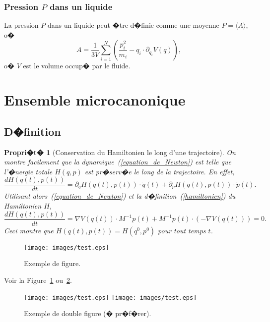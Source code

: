 \documentclass[a4paper,10pt,twoside]{report}
\newtheorem{prop}{Propri�t�}
\begin{document}
\subsubsection{Pression $P$ dans un liquide}

La pression $P$ dans un liquide peut �tre d�finie comme une moyenne $P = \langle A \rangle$, o� 
\[
A = \frac{1}{3V} \sum_{i=1}^{N} \left(\frac{p_{i}^2}{m_{i}} - q_{i} \cdot \partial_{q_{i}} V (q) \right),
\]
o� $V$ est le volume occup� par le fluide.

\section{Ensemble microcanonique}

\subsection{D�finition}

\begin{prop}[Conservation du Hamiltonien le long d'une trajectoire]
On montre facilement que la dynamique~(\ref{equation_de_Newton}) est
telle que l'�nergie totale $H(q,p)$ est pr�serv�e le long de la
trajectoire. En effet,
\[
\frac{dH(q(t),p(t))}{dt} = \partial_q H(q(t),p(t)) \cdot \dot{q}(t) + \partial_p H(q(t),p(t)) \cdot \dot{p}(t).
\]
Utilisant alors~(\ref{equation_de_Newton}) et la d�finition~(\ref{hamiltonien}) du Hamiltonien $H$,
\[
\frac{dH(q(t),p(t))}{dt} = \nabla V(q(t)) \cdot M^{-1} p(t) + M^{-1} p(t) \cdot (- \nabla V(q(t)) ) = 0.
\]
Ceci montre que $H(q(t),p(t)) = H(q^0,p^0)$ pour tout temps $t$.
\end{prop}


\begin{figure}[htbp]
\begin{center}
\texttt{[image: images/test.eps]}
\caption{ \label{fig:nom_figure}
Exemple de figure.
}
\end{center}
\end{figure}

Voir la Figure~\ref{fig:nom_figure} ou~\ref{fig:nom_figure_autre}.

\begin{figure}[htbp]
  \begin{center}
    \texttt{[image: images/test.eps]}
    \texttt{[image: images/test.eps]}
    \caption{ \label{fig:nom_figure_autre}
      Exemple de double figure (� pr�f�rer).
    }
  \end{center}
\end{figure}
\end{document}
